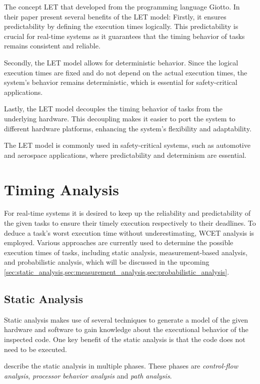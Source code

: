 The concept \ac{LET} that developed from the programming language Giotto\cite{henzingerGiottoTimetriggeredLanguage2003}.
In their paper \textcite{henzingerGiottoTimetriggeredLanguage2003} present several benefits of the \ac{LET} model:
Firstly, it ensures predictability by defining the execution times logically.
This predictability is crucial for real-time systems as it guarantees that the timing behavior of tasks remains consistent and reliable.

Secondly, the \ac{LET} model allows for deterministic behavior.
Since the logical execution times are fixed and do not depend on the actual execution times, the system's behavior remains deterministic, which is essential for safety-critical applications.

Lastly, the \ac{LET} model decouples the timing behavior of tasks from the underlying hardware.
This decoupling makes it easier to port the system to different hardware platforms, enhancing the system's flexibility and adaptability.

The \ac{LET} model is commonly used in safety-critical systems, such as automotive and aerospace applications, where predictability and determinism are essential.

\section{Timing Analysis}\label{sec:timing_analysis}
For real-time systems it is desired to keep up the reliability and predictability of the given tasks to ensure their timely execution respectively to their deadlines.
To deduce a task's worst execution time without underestimating, \ac{WCET} analysis is employed.
Various approaches are currently used to determine the possible execution times of tasks, including static analysis, measurement-based analysis, and probabilistic analysis, which will be discussed in the upcoming \cref{sec:static_analysis,sec:measurement_analysis,sec:probabilistic_analysis}.

\subsection{Static Analysis}\label{sec:static_analysis}
Static analysis makes use of several techniques to generate a model of the given hardware and software to gain knowledge about the executional behavior of the inspected code.
One key benefit of the static analysis is that the code does not need to be executed.

\textcite{wilhelmWorstcaseExecutiontimeProblem2008} describe the static analysis in multiple phases.
These phases are \textit{control-flow analysis}, \textit{processor behavior analysis} and \textit{path analysis}.

